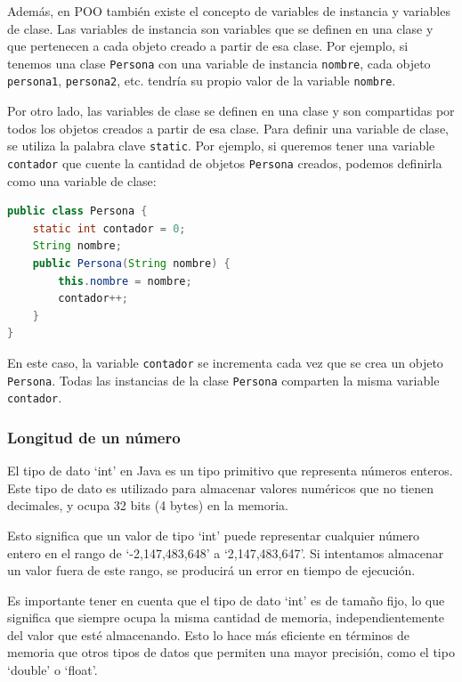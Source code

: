 \documentclass[executivepaper]{article}
\begin{document}
Además, en POO también existe el concepto de variables de instancia y variables de clase. Las variables de instancia son variables que se definen en una clase y que pertenecen a cada objeto creado a partir de esa clase. Por ejemplo, si tenemos una clase \lstinline{Persona} con una variable de instancia \lstinline{nombre}, cada objeto \lstinline{persona1}, \lstinline{persona2}, etc. tendría su propio valor de la variable \lstinline{nombre}.

Por otro lado, las variables de clase se definen en una clase y son compartidas por todos los objetos creados a partir de esa clase. Para definir una variable de clase, se utiliza la palabra clave \lstinline{static}. Por ejemplo, si queremos tener una variable \lstinline{contador} que cuente la cantidad de objetos \lstinline{Persona} creados, podemos definirla como una variable de clase:

\begin{lstlisting}[language=Java]
public class Persona {
    static int contador = 0;
    String nombre;
    public Persona(String nombre) {
        this.nombre = nombre;
        contador++;
    }
}
\end{lstlisting}

En este caso, la variable \lstinline{contador} se incrementa cada vez que se crea un objeto \lstinline{Persona}. Todas las instancias de la clase \lstinline{Persona} comparten la misma variable \lstinline{contador}.

\subsubsection*{Longitud de un número}
El tipo de dato \enquote*{int} en Java es un tipo primitivo que representa números enteros. Este tipo de dato es utilizado para almacenar valores numéricos que no tienen decimales, y ocupa 32 bits (4 bytes) en la memoria.

Esto significa que un valor de tipo \enquote*{int} puede representar cualquier número entero en el rango de \enquote*{-2,147,483,648} a \enquote*{2,147,483,647}. Si intentamos almacenar un valor fuera de este rango, se producirá un error en tiempo de ejecución.

Es importante tener en cuenta que el tipo de dato \enquote*{int} es de tamaño fijo, lo que significa que siempre ocupa la misma cantidad de memoria, independientemente del valor que esté almacenando. Esto lo hace más eficiente en términos de memoria que otros tipos de datos que permiten una mayor precisión, como el tipo \enquote*{double} o \enquote*{float}.
\end{document}
